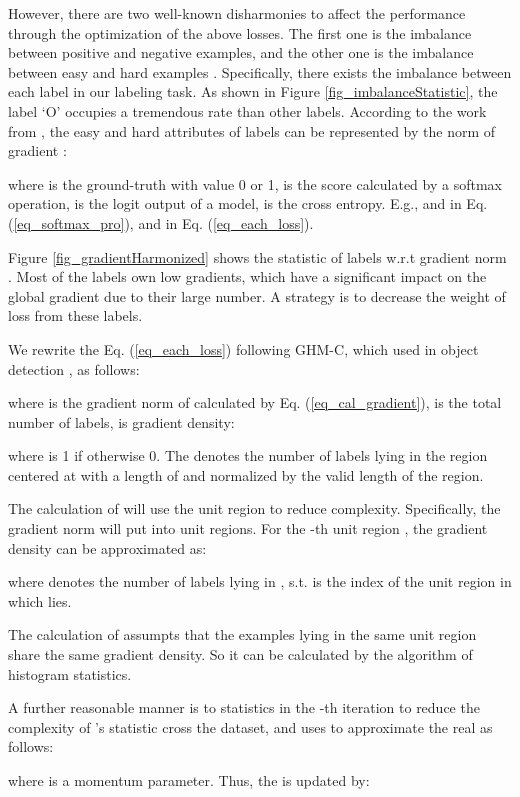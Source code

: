 \documentclass[11pt,a4paper]{article}
\begin{document}
However, there are two well-known disharmonies to affect the performance through the optimization of the above losses. The first one is the imbalance between positive and negative examples, and the other one is the imbalance between easy and hard examples \cite{Li2019}. Specifically, there exists the imbalance between each label in our labeling task. As shown in Figure \ref{fig_imbalanceStatistic}, the label `O' occupies a tremendous rate than other labels. According to the work from \citet{Li2019}, the easy and hard attributes of labels can be represented by the norm of gradient :

where  is the ground-truth with value 0 or 1,  is the score calculated by a softmax operation,  is the logit output of a model,  is the cross entropy. E.g.,  and  in Eq. (\ref{eq_softmax_pro}), and  in Eq. (\ref{eq_each_loss}).

Figure \ref{fig_gradientHarmonized} shows the statistic of labels w.r.t gradient norm . Most of the labels own low gradients, which have a significant impact on the global gradient due to their large number. A strategy is to decrease the weight of loss from these labels.

We rewrite the Eq. (\ref{eq_each_loss}) following GHM-C, which used in object detection \cite{Li2019}, as follows:

where  is the gradient norm of  calculated by Eq. (\ref{eq_cal_gradient}),  is the total number of labels,  is gradient density:

where  is 1 if  otherwise 0. The  denotes the number of labels lying in the region centered at  with a length of  and normalized by the valid length  of the region.

The calculation of  will use the unit region to reduce complexity. Specifically, the gradient norm  will put into  unit regions. For the -th unit region , the gradient density can be approximated as:

where  denotes the number of labels lying in ,  s.t.  is the index of the unit region in which  lies.

The calculation of  assumpts that the examples lying in the same unit region share the same gradient density. So it
can be calculated by the algorithm of histogram statistics.

A further reasonable manner is to statistics  in the -th iteration to reduce the complexity of 's statistic cross the dataset, and uses  to approximate the real  as follows:

where  is a momentum parameter. Thus, the  is updated by:
\end{document}
